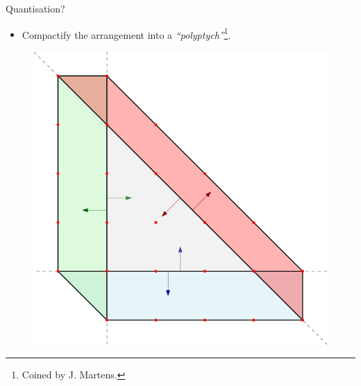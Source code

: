 \begin{frame}{Quantisation?}

    \begin{itemize}
       \item Compactify the arrangement into a \emph{``polyptych''}\footnote{Coined by J. Martens.}.
    \end{itemize}

    \begin{figure}
        \includegraphics[scale=0.3]{resources/polyptych.png}
    \end{figure}

\end{frame}